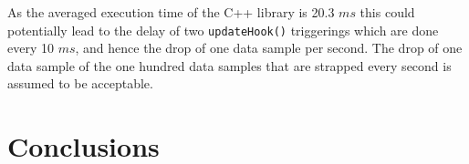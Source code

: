 \documentclass{article}
\begin{document}
As the averaged execution time of the C++ library is 20.3 $ms$ this could potentially lead to the delay of two \texttt{updateHook()} triggerings which are done every 10 $ms$, and hence the drop of one data sample per second. The drop of one data sample of the one hundred data samples that are strapped every second is assumed to be acceptable.

\section{Conclusions}


\FloatBarrier



\end{document}
